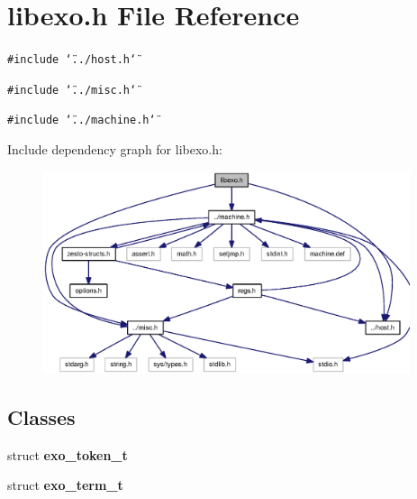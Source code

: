 \section{libexo.h File Reference}
\label{libexo_8h}
{\tt \#include \char`\"{}../host.h\char`\"{}}\par
{\tt \#include \char`\"{}../misc.h\char`\"{}}\par
{\tt \#include \char`\"{}../machine.h\char`\"{}}\par


Include dependency graph for libexo.h:\nopagebreak
\begin{figure}[H]
\begin{center}
\leavevmode
\includegraphics[width=305pt]{libexo_8h__incl}
\end{center}
\end{figure}
\subsection*{Classes}
\begin{CompactItemize}
\item 
struct {\bf exo\_\-token\_\-t}
\item 
struct {\bf exo\_\-term\_\-t}
\end{CompactItemize}
